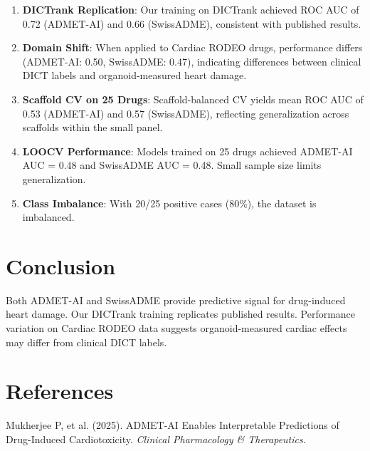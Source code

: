 \documentclass[11pt]{article}
\begin{document}
\begin{enumerate}
    \item \textbf{DICTrank Replication}: Our training on DICTrank achieved ROC AUC of 0.72 (ADMET-AI) and 0.66 (SwissADME), consistent with published results.

    \item \textbf{Domain Shift}: When applied to Cardiac RODEO drugs, performance differs (ADMET-AI: 0.50, SwissADME: 0.47), indicating differences between clinical DICT labels and organoid-measured heart damage.

    \item \textbf{Scaffold CV on 25 Drugs}: Scaffold-balanced CV yields mean ROC AUC of 0.53 (ADMET-AI) and 0.57 (SwissADME), reflecting generalization across scaffolds within the small panel.

    \item \textbf{LOOCV Performance}: Models trained on 25 drugs achieved ADMET-AI AUC = 0.48 and SwissADME AUC = 0.48. Small sample size limits generalization.

    \item \textbf{Class Imbalance}: With 20/25 positive cases (80\%), the dataset is imbalanced.
\end{enumerate}

\section{Conclusion}

Both ADMET-AI and SwissADME provide predictive signal for drug-induced heart damage. Our DICTrank training replicates published results. Performance variation on Cardiac RODEO data suggests organoid-measured cardiac effects may differ from clinical DICT labels.

\section*{References}

Mukherjee P, et al. (2025). ADMET-AI Enables Interpretable Predictions of Drug-Induced Cardiotoxicity. \textit{Clinical Pharmacology \& Therapeutics}.
\end{document}
